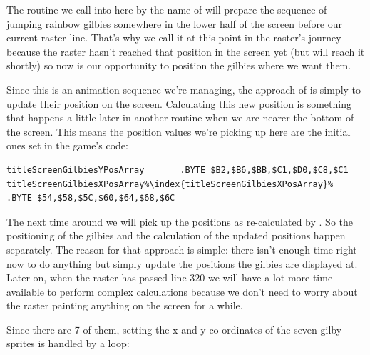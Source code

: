 The routine we call into here by the name of  will prepare the sequence
of jumping rainbow gilbies somewhere in the lower half of the screen before our current raster line. That's why we
call it at this point in the raster's journey - because the raster hasn't reached that position in the screen yet
(but will reach it shortly) so now is our opportunity to position the gilbies where we want them. 

Since this is an animation sequence we're managing, the approach of  is
simply to update their position on the screen. Calculating this new position is something that happens a little later
in another routine  when we are nearer the bottom of the screen. This means the
position values we're picking up here are the initial ones set in the game's code:

\begin{lstlisting}[escapechar=\%]
titleScreenGilbiesYPosArray       .BYTE $B2,$B6,$BB,$C1,$D0,$C8,$C1
titleScreenGilbiesXPosArray%\index{titleScreenGilbiesXPosArray}%       .BYTE $54,$58,$5C,$60,$64,$68,$6C
\end{lstlisting}

The next time around we will pick up the positions as re-calculated by .
So the positioning of the gilbies and the calculation of the updated positions happen separately. The reason
for that approach is simple: there isn't enough time right now to do anything but simply update the positions the gilbies
are displayed at.
Later on, when the raster has passed line 320 we will have a lot more time available to perform complex calculations
because we don't need to worry about the raster painting anything on the screen for a while.

Since there are 7 of them, setting the x and y co-ordinates of the seven gilby sprites is handled by a loop:

